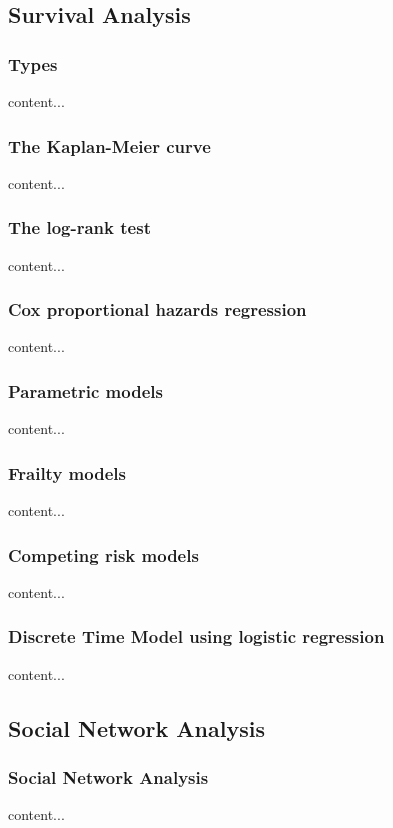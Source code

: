 \documentclass{beamer}
\begin{document}
\subsection{Survival Analysis}
\begin{frame}\frametitle{Types}
content...
\end{frame}

\begin{frame}\frametitle{The Kaplan-Meier curve}
content...
\end{frame}

\begin{frame}\frametitle{The log-rank test}
content...
\end{frame}

\begin{frame}\frametitle{Cox proportional hazards regression}
content...
\end{frame}

\begin{frame}\frametitle{Parametric models}
content...
\end{frame}

\begin{frame}\frametitle{Frailty models}
content...
\end{frame}

\begin{frame}\frametitle{Competing risk models}
content...
\end{frame}

\begin{frame}\frametitle{Discrete Time Model using logistic regression}
content...
\end{frame}



\subsection{Social Network Analysis}
\begin{frame}\frametitle{Social Network Analysis}
content...
\end{frame}
\end{document}
